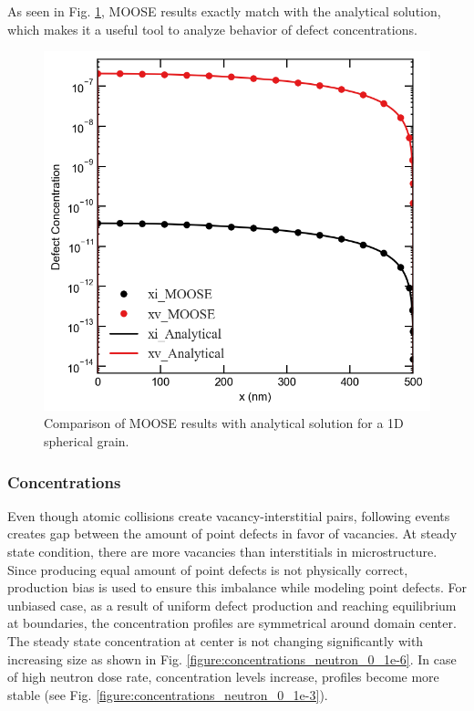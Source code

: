\documentclass[a4paper]{article}
\begin{document}
  As seen in Fig. \ref{figure:concentrations_MOOSE_analytical}, MOOSE results exactly match with the analytical solution, which makes it a useful tool to analyze behavior of defect concentrations.
  \begin{figure}[h!]
    \centering
    \includegraphics[scale=0.55]{concentration_profiles_MOOSE_Analytical_Neutron_0}
    \caption{Comparison of MOOSE results with analytical solution for a 1D spherical grain.}
    \label{figure:concentrations_MOOSE_analytical}
  \end{figure}
    \subsubsection{Concentrations} \hspace{10pt}
    Even though atomic collisions create vacancy-interstitial pairs, following events creates gap between the amount of point defects in favor of vacancies. At steady state condition, there are more vacancies than interstitials in microstructure. Since producing equal amount of point defects is not physically correct, production bias is used to ensure this imbalance while modeling point defects. For unbiased case, as a result of uniform defect production and reaching equilibrium at boundaries, the concentration profiles are symmetrical around domain center. The steady state concentration at center is not changing significantly with increasing size as shown in Fig. \ref{figure:concentrations_neutron_0_1e-6}. In case of high neutron dose rate, concentration levels increase, profiles become more stable (see Fig. \ref{figure:concentrations_neutron_0_1e-3}).
\end{document}
